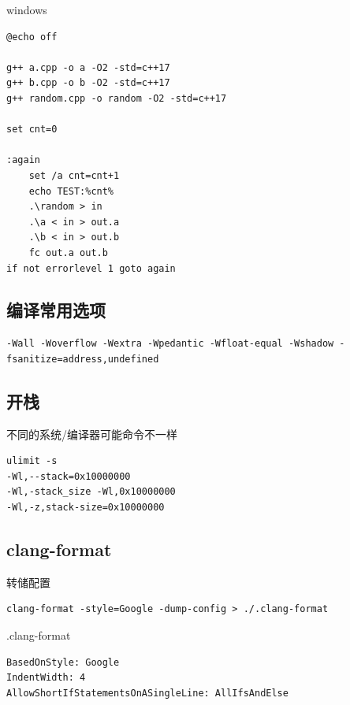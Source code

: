 \documentclass[UTF8]{ctexart}
\begin{document}
\begin{sloppypar}
windows

\begin{lstlisting}[style=cpp]
@echo off

g++ a.cpp -o a -O2 -std=c++17
g++ b.cpp -o b -O2 -std=c++17
g++ random.cpp -o random -O2 -std=c++17

set cnt=0

:again
    set /a cnt=cnt+1
    echo TEST:%cnt%
    .\random > in
    .\a < in > out.a
    .\b < in > out.b
    fc out.a out.b
if not errorlevel 1 goto again
\end{lstlisting}

\subsection{编译常用选项}

\begin{lstlisting}[style=cpp]
-Wall -Woverflow -Wextra -Wpedantic -Wfloat-equal -Wshadow -fsanitize=address,undefined
\end{lstlisting}

\subsection{开栈}

不同的系统/编译器可能命令不一样

\begin{lstlisting}[style=cpp]
ulimit -s
-Wl,--stack=0x10000000
-Wl,-stack_size -Wl,0x10000000
-Wl,-z,stack-size=0x10000000
\end{lstlisting}

\subsection{clang-format}

转储配置

\begin{lstlisting}[style=cpp]
clang-format -style=Google -dump-config > ./.clang-format
\end{lstlisting}

.clang-format

\begin{lstlisting}[style=cpp]
BasedOnStyle: Google
IndentWidth: 4
AllowShortIfStatementsOnASingleLine: AllIfsAndElse
\end{lstlisting}

\end{sloppypar}
\end{document}
